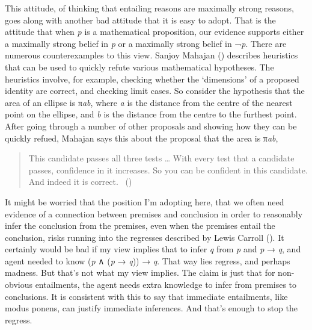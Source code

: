 \documentclass[
  10pt,
  letterpaper,
  twoside]{scrbook}
\begin{document}
This attitude, of thinking that entailing reasons are maximally strong
reasons, goes along with another bad attitude that it is easy to adopt.
That is the attitude that when \emph{p} is a mathematical proposition,
our evidence supports either a maximally strong belief in \emph{p} or a
maximally strong belief in ¬\emph{p}. There are numerous counterexamples
to this view. Sanjoy Mahajan ()
describes heuristics that can be used to quickly refute various
mathematical hypotheses. The heuristics involve, for example, checking
whether the `dimensions' of a proposed identity are correct, and
checking limit cases. So consider the hypothesis that the area of an
ellipse is π\emph{ab}, where \emph{a} is the distance from the centre of
the nearest point on the ellipse, and \emph{b} is the distance from the
centre to the furthest point. After going through a number of other
proposals and showing how they can be quickly refued, Mahajan says this
about the proposal that the area is π\emph{ab},

\begin{quote}
This candidate passes all three tests \ldots{} With every test that a
candidate passes, confidence in it increases. So you can be confident in
this candidate. And indeed it is correct.
~()
\end{quote}

It might be worried that the position I'm adopting here, that we often
need evidence of a connection between premises and conclusion in order
to reasonably infer the conclusion from the premises, even when the
premises entail the conclusion, risks running into the regresses
described by Lewis Carroll (). It
certainly would be bad if my view implies that to infer \emph{q} from
\emph{p} and \emph{p} → \emph{q}, and agent needed to know (\emph{p} ∧
(\emph{p} → \emph{q})) → \emph{q}. That way lies regress, and perhaps
madness. But that's not what my view implies. The claim is just that for
non-obvious entailments, the agent needs extra knowledge to infer from
premises to conclusions. It is consistent with this to say that
immediate entailments, like modus ponens, can justify immediate
inferences. And that's enough to stop the regress.
\end{document}
